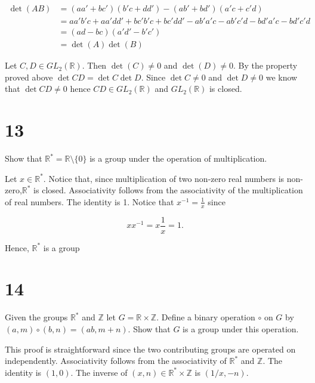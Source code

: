 \documentclass[a4paper]{article}
\begin{document}
\begin{align*}
\det(AB) &= (aa' + bc')(b'c + dd') - (ab' + bd')(a'c + c'd) \\
&= aa'b'c + aa'dd' + bc'b'c + bc'dd' - ab'a'c - ab'c'd - bd'a'c - bd'c'd \\
&= (ad - bc) (a'd' - b'c') \\
&= \det(A) \det(B)
\end{align*}

\vspace{\baselineskip}

Let $C,D \in GL_2(\mathbb{R})$. Then $\det(C) \neq 0$ and $\det(D) \neq 0$. By the property proved above $\det{CD} = \det{C}\det{D}$. Since $\det{C} \neq 0$ and $\det{D} \neq 0$ we know that $\det{CD} \neq{0}$ hence $CD \in GL_2(\mathbb{R})$ and $GL_2(\mathbb{R})$ is closed.



\section*{13}

Show that $\mathbb{R}^{*} = \mathbb{R} \setminus \{ 0 \}$ is a group under the operation of multiplication.

\vspace{\baselineskip}

Let $x \in \mathbb{R}^{*}$. Notice that, since multiplication of two non-zero real numbers is non-zero,$\mathbb{R}^{*}$ is closed. Associativity follows from the associativity of the multiplication of real numbers. The identity is 1. Notice that $x^{-1} = \frac{1}{x}$ since

$$xx^{-1} = x \frac{1}{x} = 1.$$

Hence, $\mathbb{R}^*$ is a group


\section*{14}

Given the groups $\mathbb{R}^*$ and $\mathbb{Z}$ let $G = \mathbb{R} \times \mathbb{Z}$. Define a binary operation $\circ$ on $G$ by $(a,m) \circ (b,n) = (ab, m+n)$. Show that $G$ is a group under this operation.

\vspace{\baselineskip}

This proof is straightforward since the two contributing groups are operated on independently. Associativity follows from the associativity of $\mathbb{R}^*$ and $\mathbb{Z}$. The identity is $(1,0)$. The inverse of $(x, n) \in \mathbb{R}^* \times \mathbb{Z}$ is $(1/x, -n)$.
\end{document}
